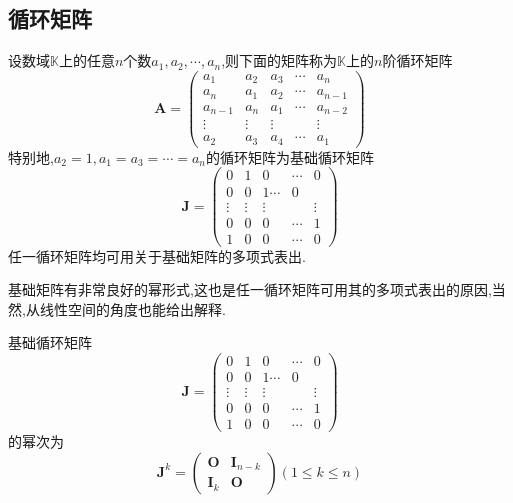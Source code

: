 \subsection{循环矩阵}
\begin{formal}
\begin{definition}[循环矩阵定义]\label{def:循环矩阵定义}
    设数域$\mathbb{K}$上的任意$n$个数$a_1,a_2,\cdots,a_n$,则下面的矩阵称为$\mathbb{K}$上的$n$阶循环矩阵
    \[
\bm{A}=\begin{pmatrix}
    a_1&a_2&a_3&\cdots&a_n\\
    a_n&a_1&a_2&\cdots&a_{n-1}\\
    a_{n-1}&a_n&a_1&\cdots&a_{n-2}\\
    \vdots&\vdots&\vdots&&\vdots\\
    a_2&a_3&a_4&\cdots&a_{1}
\end{pmatrix}
    \]
    特别地,$a_2=1,a_1=a_3=\cdots=a_n$的循环矩阵为基础循环矩阵
    \[
    \bm{J}=\begin{pmatrix}
        0&1&0&\cdots&0\\
        0&0&1\cdots&0\\
        \vdots&\vdots&\vdots&&\vdots\\
        0&0&0&\cdots&1\\
        1&0&0&\cdots&0
    \end{pmatrix}
    \]
    任一循环矩阵均可用关于基础矩阵的多项式表出.
\end{definition}
\end{formal}
基础矩阵有非常良好的幂形式,这也是任一循环矩阵可用其的多项式表出的原因,当然,从线性空间的角度也能给出解释.
\begin{green}
\begin{lemma}[基础循环矩阵的幂]\label{lem:基础循环矩阵的幂}
    基础循环矩阵
    \[
    \bm{J}=\begin{pmatrix}
        0&1&0&\cdots&0\\
        0&0&1\cdots&0\\
        \vdots&\vdots&\vdots&&\vdots\\
        0&0&0&\cdots&1\\
        1&0&0&\cdots&0
    \end{pmatrix}
    \]
    的幂次为
    \[
    \bm{J}^k=\begin{pmatrix}
        \bm{O}&\bm{I}_{n-k}\\
        \bm{I}_k&\bm{O}
    \end{pmatrix}
    \left(1\leqslant k\leqslant n\right)
    \]
\end{lemma}
\end{green}
